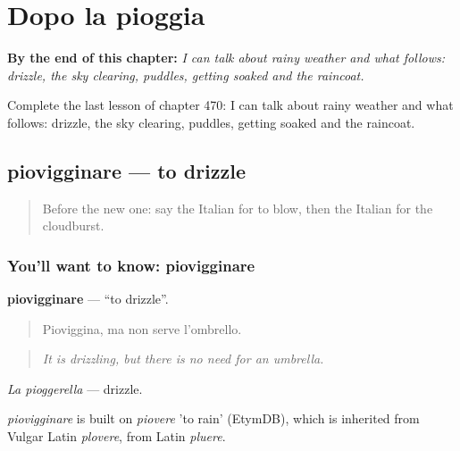 
\chapter{Dopo la pioggia}
\label{ch:it-dopo-la-pioggia}

\begin{chapteropening}
\textbf{By the end of this chapter:} \emph{I can talk about rainy weather and what follows: drizzle, the sky clearing, puddles, getting soaked and the raincoat.}

Complete the last lesson of chapter 470: I can talk about rainy weather and what follows: drizzle, the sky clearing, puddles, getting soaked and the raincoat.
\end{chapteropening}

\section[piovigginare]{piovigginare — to drizzle}

\label{lesson:IT-C470-piovigginare}



\begin{quote}
Before the new one: say the Italian for to blow, then the Italian for the cloudburst.
\end{quote}

\subsection*{You'll want to know: piovigginare}
\textbf{piovigginare} — \textquotedblleft{}to drizzle\textquotedblright{}.

\begin{quote}
Pioviggina, ma non serve l'ombrello.
\end{quote}

\begin{quote}
\emph{It is drizzling, but there is no need for an umbrella.}
\end{quote}

\emph{La pioggerella} — drizzle.

\begin{cousinweb}
\emph{piovigginare} is built on \emph{piovere} 'to rain' (EtymDB), which is inherited from Vulgar Latin \emph{plovere}, from Latin \emph{pluere}.
\end{cousinweb}

